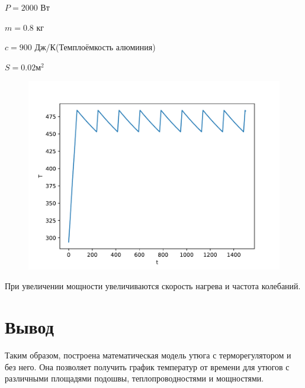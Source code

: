 \documentclass[a4paper, 14pt]{extarticle}
\begin{document}
			$P = 2000$ Вт
			
			$m = 0.8$ кг
			
			$c = 900$ Дж/К(Темплоёмкость алюминия)
			
			$S = 0.02 \text{м}^2$
			
			\begin{figure}[H]
				\centering
				\includegraphics[width = \linewidth]{fig9.pdf}
				\caption[.] {}
			\end{figure}
			При увеличении мощности увеличиваются скорость нагрева и частота колебаний.
	\section{Вывод}
		Таким образом, построена математическая модель утюга с терморегулятором и без него. Она позволяет получить график температур от времени для утюгов с различными площадями подошвы, теплопроводностями и мощностями. 
		
\end{document}
